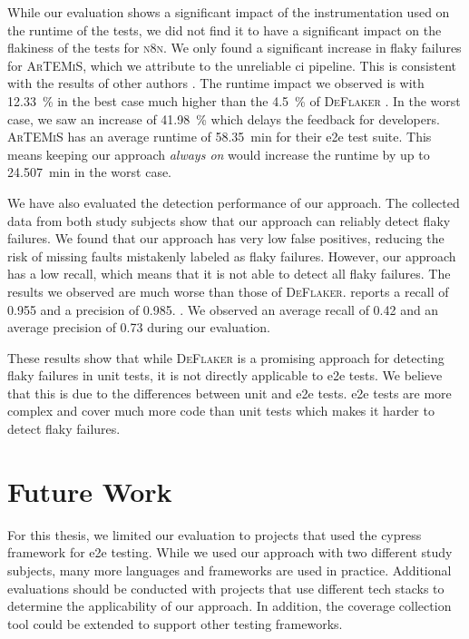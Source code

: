 While our evaluation shows a significant impact of the instrumentation used on the runtime of the tests, we did not find it to have a significant impact on the flakiness of the tests for \textsc{n8n}.
We only found a significant increase in flaky failures for \textsc{ArTEMiS}, which we attribute to the unreliable \ac{ci} pipeline.
This is consistent with the results of other authors \autocite{rasheed_effect_2023}.
The runtime impact we observed is with \SI{12.33}{\percent} in the best case much higher than the \SI{4.5}{\percent} of \textsc{DeFlaker} \autocite{bell_deflaker_2018}.
In the worst case, we saw an increase of \SI{41.98}{\percent} which delays the feedback for developers.
\textsc{ArTEMiS} has an average runtime of \SI{58.35}{\minute} for their \ac{e2e} test suite.
This means keeping our approach \textit{always on} would increase the runtime by up to \SI{24.507}{\minute} in the worst case.

We have also evaluated the detection performance of our approach.
The collected data from both study subjects show that our approach can reliably detect flaky failures.
We found that our approach has very low false positives, reducing the risk of missing faults mistakenly labeled as flaky failures.
However, our approach has a low recall, which means that it is not able to detect all flaky failures.
The results we observed are much worse than those of \textsc{DeFlaker}.
 reports a recall of \num{0.955} and a precision of \num{0.985}. \cite{bell_deflaker_2018}.
We observed an average recall of \num{0.42} and an average precision of \num{0.73} during our evaluation.

These results show that while \textsc{DeFlaker} is a promising approach for detecting flaky failures in unit tests, it is not directly applicable to \ac{e2e} tests.
We believe that this is due to the differences between unit and \ac{e2e} tests.
\Ac{e2e} tests are more complex and cover much more code than unit tests which makes it harder to detect flaky failures.

\section{Future Work}
For this thesis, we limited our evaluation to projects that used the cypress framework for \ac{e2e} testing.
While we used our approach with two different study subjects, many more languages and frameworks are used in practice.
Additional evaluations should be conducted with projects that use different tech stacks to determine the applicability of our approach.
In addition, the coverage collection tool could be extended to support other testing frameworks.

